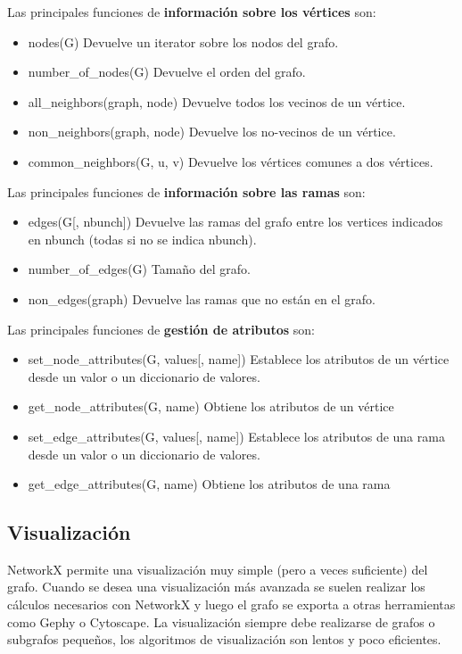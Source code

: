 Las principales funciones de \textbf{información sobre los vértices} son:
\begin{itemize}
\item nodes(G) Devuelve un iterator sobre los nodos del grafo.
\item number\_of\_nodes(G) Devuelve el orden del grafo.
\item all\_neighbors(graph, node) Devuelve todos los vecinos de un vértice.
\item non\_neighbors(graph, node) Devuelve los no-vecinos de un vértice.
\item common\_neighbors(G, u, v) Devuelve los vértices comunes a dos vértices.
\end{itemize}

Las principales funciones de \textbf{información sobre las ramas} son:
\begin{itemize}
\item edges(G[, nbunch]) Devuelve las ramas del grafo entre los vertices indicados en nbunch (todas si no se indica nbunch).
\item number\_of\_edges(G) Tamaño del grafo.
\item non\_edges(graph) Devuelve las ramas que no están en el grafo.
\end{itemize}

Las principales funciones de \textbf{gestión de atributos} son:
\begin{itemize}
\item set\_node\_attributes(G, values[, name]) Establece los atributos de un vértice desde un valor o un diccionario de valores.
\item get\_node\_attributes(G, name) Obtiene los atributos de un vértice
\item set\_edge\_attributes(G, values[, name]) Establece los atributos de una rama desde un valor o un diccionario de valores.
\item get\_edge\_attributes(G, name) Obtiene los atributos de una rama
\end{itemize}

\subsection{Visualización}
NetworkX permite una visualización muy simple (pero a veces suficiente) del grafo. Cuando se desea una visualización más avanzada se suelen realizar los cálculos necesarios con NetworkX y luego el grafo se exporta a otras herramientas como Gephy o Cytoscape. La visualización siempre debe realizarse de grafos o subgrafos pequeños, los algoritmos de visualización son lentos y poco eficientes.

